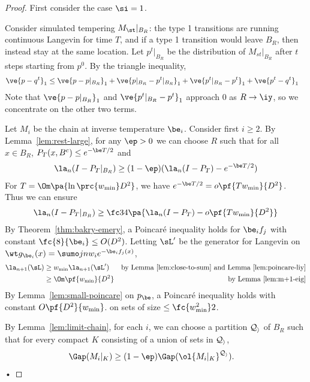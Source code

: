 \begin{proof}
First consider the case $\si=1$.

Consider simulated tempering $M_{\st}|_{B_R}$: the type 1 transitions are running continuous Langevin for time $T$, and  if a type 1 transition would leave $B_R$, then instead stay at the same location. 
Let $p^t|_{B_R}$ be the distribution of $M_{st}|_{B_R}$ after $t$ steps starting from $p^0$. 
By the triangle inequality,
\begin{align}
\ve{p-q^t}_1 &\le \ve{p-p|_{B_R}}_1
+ \ve{p|_{B_R} - p^t|_{B_R}}_1 
+ \ve{p^t|_{B_R} - p^t}_1
+ \ve{p^t-q^t}_1
\end{align}
Note that $\ve{p-p|_{B_R}}_1$ and $\ve{p^t|_{B_R}-p^t}_1$ approach 0 as $R\to \iy$, so we concentrate on the other two terms.

Let $M_i$ be the chain at inverse temperature $\be_i$.  Consider first $i\ge 2$. 
By Lemma~\ref{lem:rest-large}, for any $\ep>0$ we can choose $R$ such that for all $x\in B_R$, $P_T(x,B^c) \le e^{-\be T/2}$ and
\begin{align}
\la_n(I-P_T|_{B_R}) \ge (1-\ep)(\la_n(I-P_T) - e^{-\be T/2})
\end{align}
For $T=\Om\pa{\ln \prc{w_{\min}}D^2}$, we have $e^{-\be T/2} = o\pf{Tw_{\min}}{D^2}$.
Thus we can ensure
\begin{align}
\la_n(I-P_T|_{B_R}) \ge \fc 34\pa{\la_n(I-P_T) - o\pf{Tw_{\min}}{D^2}}
\end{align}
By Theorem~\ref{thm:bakry-emery}, a Poincar\'e inequality holds for $\be_i f_j$ with constant $\fc{8}{\be_i}\le O(D^2)$. Letting $\sL'$ be the generator for Langevin on $\wt g_{\be_i}(x)=\sumo jn w_i e^{-\be_i f_j(x)}$, 
\begin{align}
\la_{n+1}(\sL)&\ge w_{\min}\la_{n+1}(\sL')&\text{by Lemma~\ref{lem:close-to-sum} and Lemma~\ref{lem:poincare-liy}}\\
& \ge \Om\pf{w_{\min}}{D^2}&\text{by Lemma~\ref{lem:m+1-eig}}
\end{align}
By Lemma~\ref{lem:small-poincare} on $p_\be$, a Poincar\'e inequality holds with constant $O\pf{D^2}{w_{\min}}$. on sets of size $\le \fc{w_{\min}^2}2$.

By Lemma~\ref{lem:limit-chain},
for each $i$, we can choose a partition $\cal Q_i$ of $B_R$ such that for every compact $K$ consisting of a union of sets in $\cal Q_i$, 
\begin{align}
\Gap({M_i|_K}) &\ge (1-\ep)\Gap(\ol{M_i|_K}^{\cal Q_i}).
\end{align}•


\end{proof}
